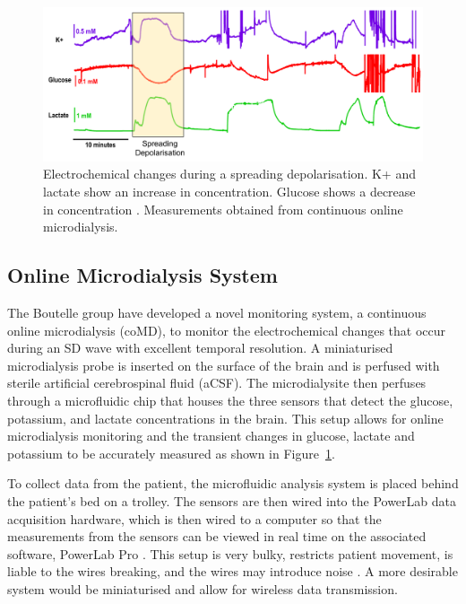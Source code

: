 \begin{figure}[t!]
\centering
\includegraphics[trim={0cm 0cm 0cm  0cm}, clip, width=1\textwidth]{./figures/sd.pdf}
\captionsetup{justification=centering}
\caption{Electrochemical changes during a spreading depolarisation. K+ and lactate show an increase in concentration. Glucose shows a decrease in concentration \cite{Rogers2017}. Measurements obtained from continuous online microdialysis.}
\label{fig: SD}
\end{figure}

\subsection{Online Microdialysis System}
The Boutelle group have developed a novel monitoring system, a continuous online microdialysis (coMD), to monitor the electrochemical changes that occur during an SD wave with excellent temporal resolution. A miniaturised microdialysis probe is inserted on the surface of the brain and is perfused with sterile artificial cerebrospinal fluid (aCSF). The microdialysite then perfuses through a microfluidic chip that houses the three sensors that detect the glucose, potassium, and lactate concentrations in the brain. This setup allows for online microdialysis monitoring and the transient changes in glucose, lactate and potassium to be accurately measured \cite{Rogers2017} as shown in Figure~\ref{fig: SD}.

To collect data from the patient, the microfluidic analysis system is placed behind the patient's bed on a trolley. The sensors are then wired into the PowerLab data acquisition hardware, which is then wired to a computer so that the measurements from the sensors can be viewed in real time on the associated software, PowerLab Pro \cite{Rogers2017}. This setup is very bulky, restricts patient movement, is liable to the wires breaking, and the wires may introduce noise \cite{Ferguson2011}. A more desirable system would be miniaturised and allow for wireless data transmission.



